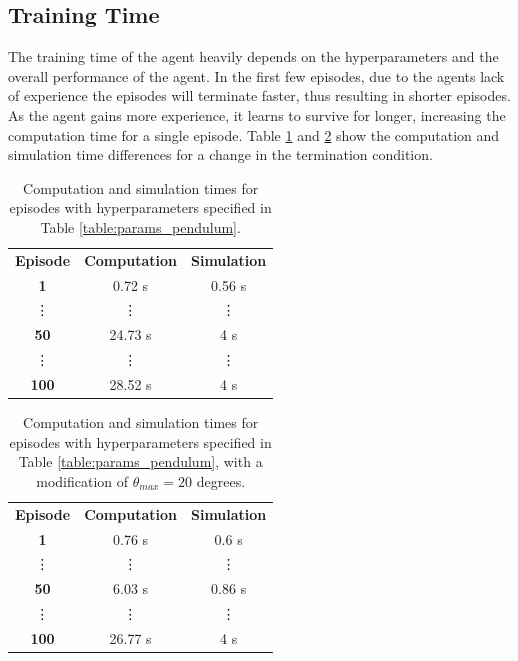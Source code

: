\documentclass[final]{LTHtwocol} %
\begin{document}
\subsection{Training Time}
The training time of the agent heavily depends on the hyperparameters and the overall performance of the agent. 
In the first few episodes, due to the agents lack of experience the episodes will terminate faster, thus resulting in shorter episodes.
As the agent gains more experience, it learns to survive for longer, increasing the computation time for a single episode.
Table \ref{table:def_params_time} and \ref{table:other_params_time} show the computation and simulation time differences for a change in the termination condition.
\begin{table}[H]
	\centering
	\begin{tabular}{|c|c|c|}
	\hline
	\rowcolor[HTML]{CBCEFB} 
	\multicolumn{3}{|c|}{\cellcolor[HTML]{CBCEFB}\textbf{Single Pendulum}} \\ \hline
	\rowcolor[HTML]{FFCCC9} 
	\textbf{Episode} & \textbf{Computation} & \textbf{Simulation} \\ \hline
	\rowcolor[HTML]{FFFFC7} 
	\textbf{1} & 0.72 s & 0.56 s\\ \hline
	\rowcolor[HTML]{FFFFC7} 
	\vdots & \vdots & \vdots \\ \hline
	\rowcolor[HTML]{FFFFC7} 
	\textbf{50} & 24.73 s & 4 s \\ \hline
	\rowcolor[HTML]{FFFFC7} 
	\vdots & \vdots & \vdots \\ \hline
	\rowcolor[HTML]{FFFFC7} 
	\textbf{100} & 28.52 s & 4 s\\ \hline
	\end{tabular}
	\caption{Computation and simulation times for episodes with hyperparameters specified in Table \ref{table:params_pendulum}.}
	\label{table:def_params_time}
\end{table}



\begin{table}[H]
	\centering
	\begin{tabular}{|c|c|c|}
	\hline
	\rowcolor[HTML]{CBCEFB} 
	\multicolumn{3}{|c|}{\cellcolor[HTML]{CBCEFB}\textbf{Single Pendulum}} \\ \hline
	\rowcolor[HTML]{FFCCC9} 
	\textbf{Episode} & \textbf{Computation} & \textbf{Simulation} \\ \hline
	\rowcolor[HTML]{FFFFC7} 
	\textbf{1} & 0.76 s & 0.6 s \\ \hline
	\rowcolor[HTML]{FFFFC7} 
	\vdots & \vdots & \vdots \\ \hline
	\rowcolor[HTML]{FFFFC7} 
	\textbf{50} & 6.03 s & 0.86 s \\ \hline
	\rowcolor[HTML]{FFFFC7} 
	\vdots & \vdots & \vdots \\ \hline
	\rowcolor[HTML]{FFFFC7} 
	\textbf{100} & 26.77 s & 4 s\\ \hline
	\end{tabular}
	\caption{Computation and simulation times for episodes with hyperparameters specified in Table \ref{table:params_pendulum}, with a modification of $\theta_{max} = 20$ degrees.}
	\label{table:other_params_time}
\end{table}
\end{document}
